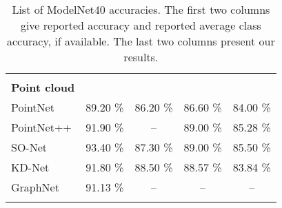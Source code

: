 \begin{table}[]
\begin{tabular}{lcccc}
		                     &                    &                         &                   &                         \\
		\textbf{Point cloud} &                    &                         &                   &                         \\
		PointNet             &      89.20 \%      &        86.20 \%         &     86.60 \%      &        84.00 \%         \\
		PointNet++           &      91.90 \%      &           --            &     89.00 \%      &        85.28 \%         \\
		SO-Net               &      93.40 \%      &        87.30 \%         &     89.00 \%      &        85.50 \%         \\
		KD-Net               &      91.80 \%      &        88.50 \%         &     88.57 \%      &        83.84 \%         \\
		GraphNet             &      91.13 \%      &           --            &        --         &           --            \\ \hline
		                     &                    &                         &                   &
	\end{tabular}
\caption{List of ModelNet40 accuracies. The first two columns give reported accuracy and reported average class accuracy, if available. The last two columns present our results.}
\label{Table:accs}
\end{table}